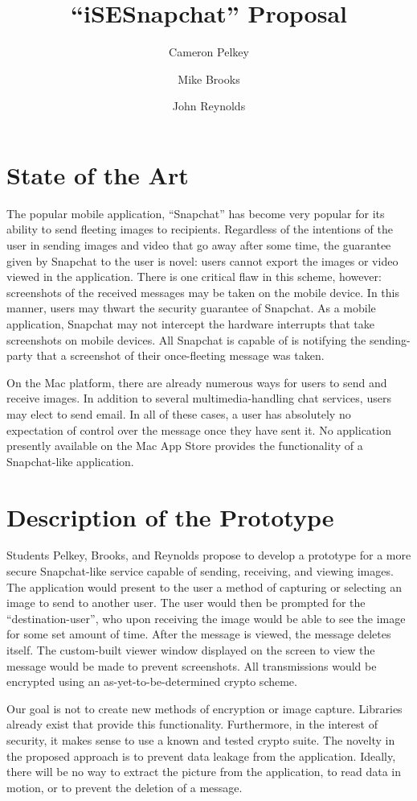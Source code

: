 \documentclass{article}
\title{``iSESnapchat'' Proposal}
\author{Cameron Pelkey \and Mike Brooks \and John Reynolds}
\date{}
\begin{document}
\maketitle

\section{State of the Art}
The popular mobile application, ``Snapchat'' has become very popular for its ability to send fleeting images to recipients. Regardless of the intentions of the user in sending images and video that go away after some time, the guarantee given by Snapchat to the user is novel: users cannot export the images or video viewed in the application. There is one critical flaw in this scheme, however: screenshots of the received messages may be taken on the mobile device. In this manner, users may thwart the security guarantee of Snapchat. As a mobile application, Snapchat may not intercept the hardware interrupts that take screenshots on mobile devices. All Snapchat is capable of is notifying the sending-party that a screenshot of their once-fleeting message was taken.

On the Mac platform, there are already numerous ways for users to send and receive images. In addition to several multimedia-handling chat services, users may elect to send email. In all of these cases, a user has absolutely no expectation of control over the message once they have sent it. No application presently available on the Mac App Store provides the functionality of a Snapchat-like application. 

\section{Description of the Prototype}
Students Pelkey, Brooks, and Reynolds propose to develop a prototype for a more secure Snapchat-like service capable of sending, receiving, and viewing images. The application would present to the user a method of capturing or selecting an image to send to another user. The user would then be prompted for the ``destination-user'', who upon receiving the image would be able to see the image for some set amount of time. After the message is viewed, the message deletes itself. The custom-built viewer window displayed on the screen to view the message would be made to prevent screenshots. All transmissions would be encrypted using an as-yet-to-be-determined crypto scheme. 

Our goal is not to create new methods of encryption or image capture. Libraries already exist that provide this functionality. Furthermore, in the interest of security, it makes sense to use a known and tested crypto suite. The novelty in the proposed approach is to prevent data leakage from the application. Ideally, there will be no way to extract the picture from the application, to read data in motion, or to prevent the deletion of a message. 
\end{document}
